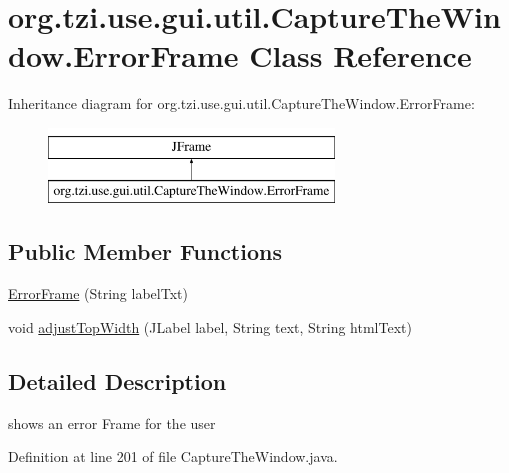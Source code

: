 \hypertarget{classorg_1_1tzi_1_1use_1_1gui_1_1util_1_1_capture_the_window_1_1_error_frame}{\section{org.\-tzi.\-use.\-gui.\-util.\-Capture\-The\-Window.\-Error\-Frame Class Reference}
\label{classorg_1_1tzi_1_1use_1_1gui_1_1util_1_1_capture_the_window_1_1_error_frame}
}
Inheritance diagram for org.\-tzi.\-use.\-gui.\-util.\-Capture\-The\-Window.\-Error\-Frame\-:\begin{figure}[H]
\begin{center}
\leavevmode
\includegraphics[height=2.000000cm]{classorg_1_1tzi_1_1use_1_1gui_1_1util_1_1_capture_the_window_1_1_error_frame}
\end{center}
\end{figure}
\subsection*{Public Member Functions}
\begin{DoxyCompactItemize}
\item 
\hyperlink{classorg_1_1tzi_1_1use_1_1gui_1_1util_1_1_capture_the_window_1_1_error_frame_aeafe9db08189aca84259b9c2895dab2a}{Error\-Frame} (String label\-Txt)
\item 
void \hyperlink{classorg_1_1tzi_1_1use_1_1gui_1_1util_1_1_capture_the_window_1_1_error_frame_ab36245a2074e027860a471dbb638c7d4}{adjust\-Top\-Width} (J\-Label label, String text, String html\-Text)
\end{DoxyCompactItemize}


\subsection{Detailed Description}
shows an error Frame for the user 

Definition at line 201 of file Capture\-The\-Window.\-java.



